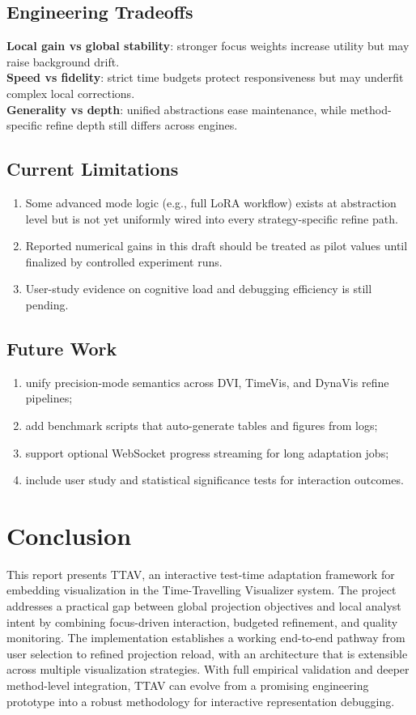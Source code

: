 \documentclass[12pt,a4paper]{report}
\newcommand{\systemname}{TTAV}
\newcommand{\projectname}{Time-Travelling Visualizer}
\begin{document}
\section{Engineering Tradeoffs}
\textbf{Local gain vs global stability}: stronger focus weights increase utility but may raise background drift.\\
\textbf{Speed vs fidelity}: strict time budgets protect responsiveness but may underfit complex local corrections.\\
\textbf{Generality vs depth}: unified abstractions ease maintenance, while method-specific refine depth still differs across engines.

\section{Current Limitations}
\begin{enumerate}
\item Some advanced mode logic (e.g., full LoRA workflow) exists at abstraction level but is not yet uniformly wired into every strategy-specific refine path.
\item Reported numerical gains in this draft should be treated as pilot values until finalized by controlled experiment runs.
\item User-study evidence on cognitive load and debugging efficiency is still pending.
\end{enumerate}

\section{Future Work}
\begin{enumerate}
\item unify precision-mode semantics across DVI, TimeVis, and DynaVis refine pipelines;
\item add benchmark scripts that auto-generate tables and figures from logs;
\item support optional WebSocket progress streaming for long adaptation jobs;
\item include user study and statistical significance tests for interaction outcomes.
\end{enumerate}

\chapter{Conclusion}
This report presents \systemname{}, an interactive test-time adaptation framework for embedding visualization in the \projectname{} system. The project addresses a practical gap between global projection objectives and local analyst intent by combining focus-driven interaction, budgeted refinement, and quality monitoring. The implementation establishes a working end-to-end pathway from user selection to refined projection reload, with an architecture that is extensible across multiple visualization strategies. With full empirical validation and deeper method-level integration, \systemname{} can evolve from a promising engineering prototype into a robust methodology for interactive representation debugging.
\end{document}
